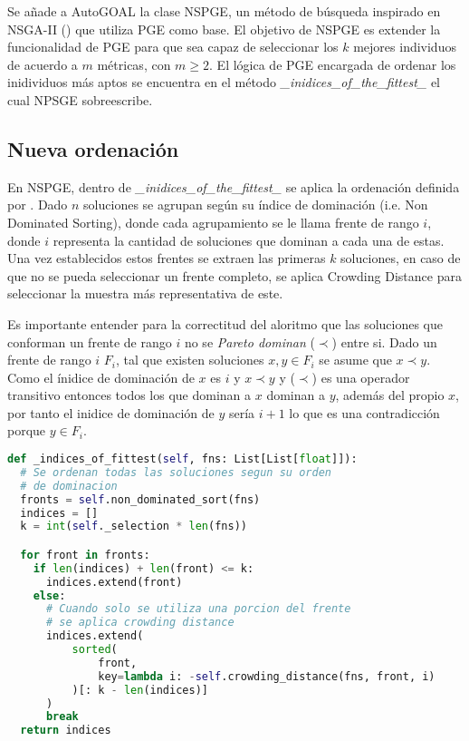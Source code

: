 Se a\~nade a AutoGOAL la clase NSPGE, un m\'etodo de b\'usqueda inspirado en NSGA-II (\cite{deb2002fast}) que utiliza PGE como base. El objetivo de NSPGE es extender la funcionalidad de PGE para que sea capaz de seleccionar los $k$ mejores individuos de acuerdo a $m$ m\'etricas, con $m \ge 2$. El l\'ogica de PGE encargada de ordenar los inidividuos m\'as aptos se encuentra en el m\'etodo \textit{\_inidices\_of\_the\_fittest\_} el cual NPSGE sobreescribe.

\subsection{Nueva ordenaci\'on}

En NSPGE, dentro de \textit{\_inidices\_of\_the\_fittest\_} se aplica la ordenaci\'on definida por \cite{deb2002fast}. Dado $n$ soluciones se  agrupan seg\'un su \'indice de dominaci\'on (i.e. Non Dominated Sorting), donde cada agrupamiento se le llama frente de rango $i$, donde $i$ representa la cantidad de soluciones que dominan a cada una de estas. Una vez establecidos estos frentes se extraen las primeras $k$ soluciones, en caso de que no se pueda seleccionar un frente completo, se aplica Crowding Distance para seleccionar la muestra m\'as representativa de este.

Es importante entender para la correctitud del aloritmo  que las soluciones que conforman un frente de rango $i$ no se \textit{Pareto dominan} ($\prec$) entre si.
Dado un frente de rango $i$ $F_i$, tal que existen soluciones $x, y \in F_i$ se asume que $x \prec y$. Como el \'inidice de dominaci\'on de $x$ es $i$ y $x \prec y$ y ($\prec$) es una operador transitivo entonces todos los que dominan a $x$ dominan a $y$, adem\'as del propio $x$, por tanto el inidice de dominaci\'on de $y$ ser\'ia $i+1$ lo que es una contradicci\'on porque $y \in F_i$. 

\begin{lstlisting}[language=Python]
def _indices_of_fittest(self, fns: List[List[float]]):
  # Se ordenan todas las soluciones segun su orden
  # de dominacion
  fronts = self.non_dominated_sort(fns)
  indices = []
  k = int(self._selection * len(fns))

  for front in fronts:
    if len(indices) + len(front) <= k:
      indices.extend(front)
    else:
      # Cuando solo se utiliza una porcion del frente
      # se aplica crowding distance
      indices.extend(
          sorted(
              front,
              key=lambda i: -self.crowding_distance(fns, front, i)
          )[: k - len(indices)]
      )
      break
  return indices
\end{lstlisting}

